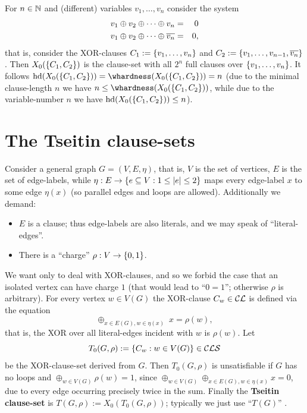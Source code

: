 \documentclass[]{book}
\begin{document}
\begin{examp}\label{exp:2xor0}
  \cite{h8} For $n \in \mathbb{N}$ and (different) variables $v_1,\dots,v_n$ consider the system
  \begin{eqnarray*}
    v_1 \oplus v_2 \oplus \dots \oplus v_n &=& 0 \\
    v_1 \oplus v_2 \oplus \dots \oplus \overline{v_n} &=& 0,
  \end{eqnarray*}
  that is, consider the XOR-clauses $C_1 := \{ v_1,\dots,v_n \}$ and $C_2 := \{ v_1,\dots,v_{n-1},\overline{v_n} \}$. Then $X_0(\{ C_1,C_2 \})$ 
  is the clause-set with all $2^n$ full clauses over $\{ v_1,\dots,v_n \}$. It follows $\hardness(X_0(\set{C_1,C_2})) = \whardness(X_0(\set{C_1,C_2})) = n$ (due to the minimal 
  clause-length $n$ we have $n \le \whardness(X_0(\set{C_1,C_2}))$, while due to the variable-number $n$ we have $\operatorname{hd}(X_0(\{ C_1,C_2 \})) \le n$).
\end{examp}


\section{The Tseitin clause-sets}
\label{sec:Tseitin cls}

Consider a general graph $G = (V,E,\eta)$, that is, $V$ is the set of vertices, $E$ is the set of edge-labels, while 
$\eta: E \rightarrow \{ e \subseteq V : 1 \le \lvert e \rvert \le 2 \}$ maps every edge-label $x$ to some edge $\eta(x)$ (so parallel edges and loops are allowed). 
Additionally we demand:
\begin{itemize}
\item $E$ is a clause; thus edge-labels are also literals, and we may speak of ``literal-edges''.
\item There is a ``charge'' $\rho: V \rightarrow \{ 0,1 \}$.
\end{itemize}
We want only to deal with XOR-clauses, and so we forbid the case that an isolated vertex can have charge $1$ (that would lead to ``$0 = 1$''; 
otherwise $\rho$ is arbitrary). For every vertex $w \in V(G)$ the XOR-clause $C_w \in \mathcal{CL}$ is defined via the equation
\begin{displaymath}
  \oplus_{x \in E(G), w \in \eta(x)} \; x = \rho(w),
\end{displaymath}
that is, the XOR over all literal-edges incident with $w$ is $\rho(w)$. Let
\begin{displaymath}
  T_0(G,\rho) := \{ C_w : w \in V(G) \} \in \mathcal{CLS}
\end{displaymath}
be the XOR-clause-set derived from $G$. Then $T_0(G,\rho)$ is unsatisfiable if $G$ has no loops and  $\oplus_{w \in V(G)} \rho(w) = 1$, since 
$\oplus_{w \in V(G)} \oplus_{x \in E(G), w \in \eta(x)} x = 0$, due to every edge occurring precisely twice in the sum. Finally the 
\textbf{Tseitin clause-set} is $T(G,\rho) := X_0(T_0(G,\rho))$; typically we just use ``$T(G)$'' \cite{h8}.
\end{document}
